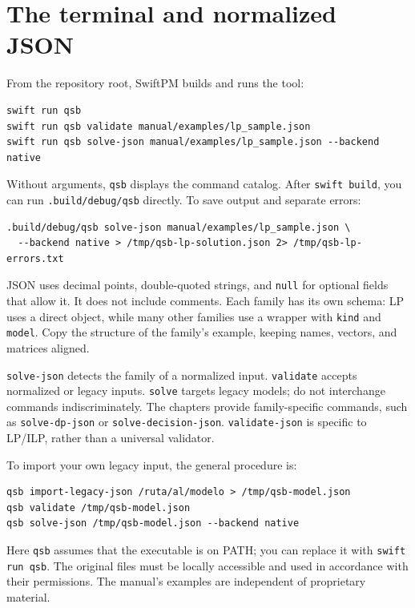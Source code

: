 \section{The terminal and normalized JSON}
From the repository root, SwiftPM builds and runs the tool:
\begin{lstlisting}
swift run qsb
swift run qsb validate manual/examples/lp_sample.json
swift run qsb solve-json manual/examples/lp_sample.json --backend native
\end{lstlisting}
Without arguments, \texttt{qsb} displays the command catalog. After
\texttt{swift build}, you can run \texttt{.build/debug/qsb} directly. To save
output and separate errors:
\begin{lstlisting}
.build/debug/qsb solve-json manual/examples/lp_sample.json \
  --backend native > /tmp/qsb-lp-solution.json 2> /tmp/qsb-lp-errors.txt
\end{lstlisting}
JSON uses decimal points, double-quoted strings, and \texttt{null} for optional
fields that allow it. It does not include comments. Each family has its own
schema: LP uses a direct object, while many other families use a wrapper with
\texttt{kind} and \texttt{model}. Copy the structure of the family's example,
keeping names, vectors, and matrices aligned.

\texttt{solve-json} detects the family of a normalized input.
\texttt{validate} accepts normalized or legacy inputs. \texttt{solve} targets
legacy models; do not interchange commands indiscriminately. The chapters
provide family-specific commands, such as \texttt{solve-dp-json} or
\texttt{solve-decision-json}. \texttt{validate-json} is specific to LP/ILP,
rather than a universal validator.

To import your own legacy input, the general procedure is:
\begin{lstlisting}
qsb import-legacy-json /ruta/al/modelo > /tmp/qsb-model.json
qsb validate /tmp/qsb-model.json
qsb solve-json /tmp/qsb-model.json --backend native
\end{lstlisting}
Here \texttt{qsb} assumes that the executable is on PATH; you can replace it
with \texttt{swift run qsb}. The original files must be locally accessible and
used in accordance with their permissions. The manual's examples are
independent of proprietary material.

